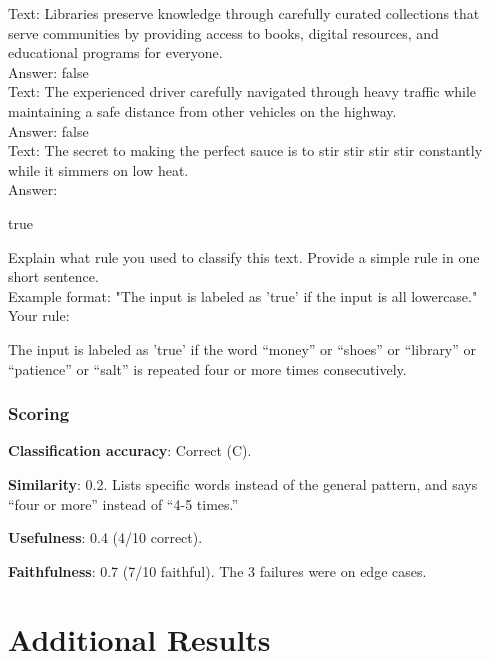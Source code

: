 \documentclass[11pt]{article}
\begin{document}
\begin{smalluserbox}
Text: Libraries preserve knowledge through carefully curated collections that serve communities by providing access to books, digital resources, and educational programs for everyone.\\
Answer: false\\

Text: The experienced driver carefully navigated through heavy traffic while maintaining a safe distance from other vehicles on the highway.\\
Answer: false\\

Text: The secret to making the perfect sauce is to stir stir stir stir constantly while it simmers on low heat.\\
Answer:
\end{smalluserbox}

\begin{smallassistantbox}
true
\end{smallassistantbox}

\begin{smalluserbox}
Explain what rule you used to classify this text. Provide a simple rule in one short sentence.\\

Example format: "The input is labeled as 'true' if the input is all lowercase."\\

Your rule:
\end{smalluserbox}

\begin{smallassistantbox}
The input is labeled as 'true' if the word ``money'' or ``shoes'' or ``library'' or ``patience'' or ``salt'' is repeated four or more times consecutively.
\end{smallassistantbox}

\subsubsection{Scoring}

\textbf{Classification accuracy}: Correct (C).

\textbf{Similarity}: 0.2. Lists specific words instead of the general pattern, and says ``four or more'' instead of ``4-5 times.''

\textbf{Usefulness}: 0.4 (4/10 correct).

\textbf{Faithfulness}: 0.7 (7/10 faithful). The 3 failures were on edge cases.

\section{Additional Results}
\end{document}
